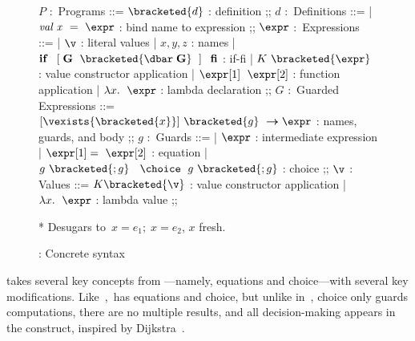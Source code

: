 \documentclass[manuscript,screen 12pt, nonacm]{acmart}
\begin{document}
        \begin{figure}[H]
          \begin{center}
            \begin{bnf}
            $P$ :~\textsf{Programs} ::=
            $\bracketed{d}$ : definition
            ;;
            $d$ :~\textsf{Definitions} ::=
            | $\it{val}\; x\;~\it{=}\;~\expr$ : bind name to expression
            ;;
            $\expr$ :~\textsf{Expressions} ::=
            | $\v$ : literal values 
            | $x, y, z$ : names
            | $\bf{if}\;~\left[\; G\;~\bracketed{\dbar\; G}\;~\right]\;~\bf{fi}$ : if-fi 
            | $K~\bracketed{\expr}$ : value constructor application 
            | $\expr[1]\;~\expr[2]$ : function application 
            | $\lambda x.\;~\expr$ : lambda declaration 
            ;;
            $G$ :~\textsf{Guarded Expressions} ::=  
            $[\vexists{\bracketed{x}}]~\bracketed{g}~\boldsymbol{\rightarrow}\expr$ : names, guards, and body
            ;;
            $g$ :~\textsf{Guards} ::=  
            | $\expr$ : intermediate expression 
            | $\expr[1] =~\expr[2]$ : equation 
            | $ g~\bracketed{; g}~\;~\choice~\; g~\bracketed{; g}$ : choice 
            ;;
            $\v$ : Values ::= $K\bracketed{\v}$ : value constructor application 
            | $\lambda x.\;~\expr$ : lambda value
            ;;
            \end{bnf}
            \medskip
          
          * Desugars to~{$x = e_{1};\; x = e_{2}$}, $x$ fresh. 
          \end{center}
              \caption{\VMinus: Concrete syntax}
              \label{fig:vmsyntax}
              \end{figure}      

        \VMinus takes several key concepts from {\VC}---namely, equations and
        choice---with several key modifications. Like~\VC,~\VMinus has
        equations and choice, but unlike in~\VC, choice only guards computations, 
        there are no multiple results, and all decision-making appears in the 
        \iffibf construct, inspired by Dijkstra~\citep{dijkstra}. 
      
\end{document}
